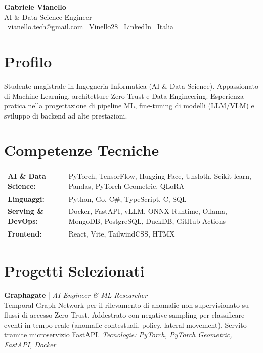 \documentclass[a4paper,10pt]{article}
\newcommand{\projectentry}[3]{
  \noindent\textbf{#1} | \textit{#2}\\
  #3\vspace{0.3em}
}
\begin{document}
\begin{center}
  {\Huge\bfseries Gabriele Vianello} \\[0.5em]
  {\Large\color{accent} AI \& Data Science Engineer} \\[0.5em]
  \faEnvelope~\href{mailto:vianello.tech@gmail.com}{vianello.tech@gmail.com} \quad
  \faGithub~\href{https://github.com/Vinello28}{Vinello28} \quad
  \faLinkedin~\href{https://www.linkedin.com/in/gabriele-vianello-476a331a1}{LinkedIn} \quad
  \faMapMarker~Italia
\end{center}

\vspace{0.5em}

\section{Profilo}
Studente magistrale in Ingegneria Informatica (AI \& Data Science). 
Appassionato di Machine Learning, architetture Zero-Trust e Data Engineering. 
Esperienza pratica nella progettazione di pipeline ML, fine-tuning di modelli (LLM/VLM) e sviluppo di backend ad alte prestazioni.

\section{Competenze Tecniche}
\begin{tabularx}{\textwidth}{@{}l X@{}}
  \textbf{AI \& Data Science:} & PyTorch, TensorFlow, Hugging Face, Unsloth, Scikit-learn, Pandas, PyTorch Geometric, QLoRA \\
  \textbf{Linguaggi:} & Python, Go, C\#, TypeScript, C, SQL \\
  \textbf{Serving \& DevOps:} & Docker, FastAPI, vLLM, ONNX Runtime, Ollama, MongoDB, PostgreSQL, DuckDB, GitHub Actions \\
  \textbf{Frontend:} & React, Vite, TailwindCSS, HTMX \\
\end{tabularx}

\section{Progetti Selezionati}

\projectentry{Graphagate}{AI Engineer \& ML Researcher}{Temporal Graph Network per il rilevamento di anomalie non supervisionato su flussi di accesso Zero-Trust. Addestrato con negative sampling per classificare eventi in tempo reale (anomalie contestuali, policy, lateral-movement). Servito tramite microservizio FastAPI. \textit{Tecnologie: PyTorch, PyTorch Geometric, FastAPI, Docker}}
\end{document}
